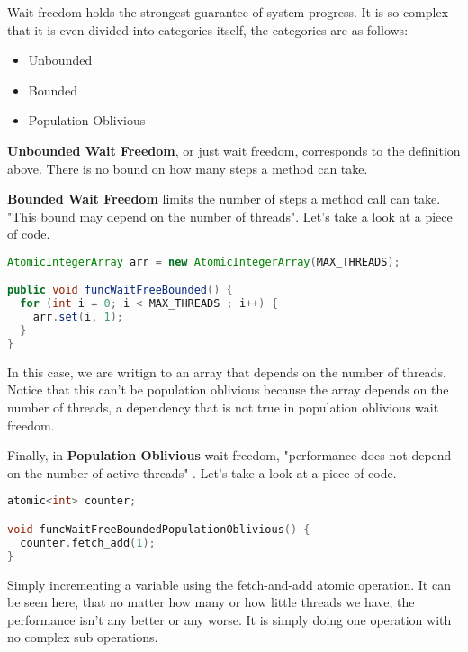 \documentclass[letterpaper, 12pt]{article}
\begin{document}
Wait freedom holds the strongest guarantee of system progress. It is so complex that it is 
even divided into categories itself, the categories are as follows:

\begin{itemize}
  \item Unbounded
  \item Bounded
  \item Population Oblivious
\end{itemize}
\newpage

{\bfseries Unbounded Wait Freedom}, or just wait freedom, corresponds to the definition above. There is no bound on how many steps a method can take. 

\par\vspace{\baselineskip}

{\bfseries Bounded Wait Freedom} limits the number of steps a method call can take. "This bound 
may depend on the number of threads"\citep[p. 59]{artofmulti}. Let's take a look at a 
piece of code. \citep{concurrencyfreaks}

\begin{lstlisting}[language=Java]
AtomicIntegerArray arr = new AtomicIntegerArray(MAX_THREADS);

public void funcWaitFreeBounded() {
  for (int i = 0; i < MAX_THREADS ; i++) {
    arr.set(i, 1);
  }
}
\end{lstlisting} 

In this case, we are writign to an array that depends on the number of threads. Notice that this can't be 
population oblivious because the array depends on the number of threads, a dependency that is not 
true in population oblivious wait freedom.

\par\vspace{\baselineskip}
Finally, in {\bfseries Population Oblivious} wait freedom, "performance does not depend on the 
number of active threads" \citep[p. 59]{artofmulti}. Let's take a look at a piece of code. \citep{concurrencyfreaks}

\begin{lstlisting}[language=C++]
atomic<int> counter;

void funcWaitFreeBoundedPopulationOblivious() {
  counter.fetch_add(1);
}
\end{lstlisting} 

Simply incrementing a variable using the fetch-and-add atomic operation. It can be seen here, that no 
matter how many or how little threads we have, the performance isn't any better or any worse. 
It is simply doing one operation with no complex sub operations.
\end{document}
